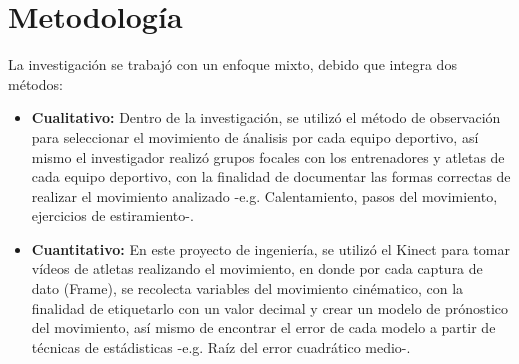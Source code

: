 \chapter{Metodolog\'ia}
La investigaci\'on se trabaj\'o con un enfoque mixto, debido que integra dos m\'etodos:
\begin{itemize}
	\item \textbf{Cualitativo:} Dentro de la investigaci\'on, se utiliz\'o el m\'etodo de observaci\'on para seleccionar el movimiento de \'analisis por cada equipo deportivo, as\'i mismo el investigador realiz\'o grupos focales con los entrenadores y atletas de cada equipo deportivo, con la finalidad de documentar las formas correctas de realizar el movimiento analizado -e.g. Calentamiento, pasos del movimiento, ejercicios de estiramiento-.
	\item \textbf{Cuantitativo:} En este proyecto de ingenier\'ia, se utiliz\'o el Kinect para tomar v\'ideos de atletas realizando el movimiento, en donde por cada captura de dato (Frame), se recolecta variables del movimiento cin\'ematico, con la finalidad de etiquetarlo con un valor decimal y crear un modelo de pr\'onostico del movimiento, as\'i mismo de encontrar el error de cada modelo a partir de t\'ecnicas de est\'adisticas -e.g.  Ra\'iz del error cuadr\'atico medio-.
\end{itemize}



